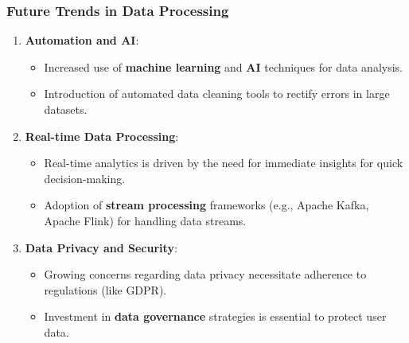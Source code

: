 \documentclass{beamer}
\begin{document}
\begin{frame}[fragile]
    \frametitle{Future Trends in Data Processing}
    \begin{enumerate}
        \item \textbf{Automation and AI}:
        \begin{itemize}
            \item Increased use of \textbf{machine learning} and \textbf{AI} techniques for data analysis.
            \item Introduction of automated data cleaning tools to rectify errors in large datasets.
        \end{itemize}
        
        \item \textbf{Real-time Data Processing}:
        \begin{itemize}
            \item Real-time analytics is driven by the need for immediate insights for quick decision-making.
            \item Adoption of \textbf{stream processing} frameworks (e.g., Apache Kafka, Apache Flink) for handling data streams.
        \end{itemize}

        \item \textbf{Data Privacy and Security}:
        \begin{itemize}
            \item Growing concerns regarding data privacy necessitate adherence to regulations (like GDPR).
            \item Investment in \textbf{data governance} strategies is essential to protect user data.
        \end{itemize}
    \end{enumerate}
\end{frame}
\end{document}
